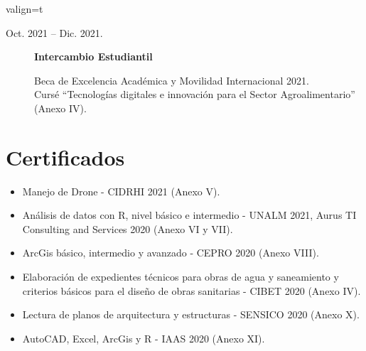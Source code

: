 \documentclass[a4paper,10pt]{article}
\begin{document}
\begin{adjustbox}{valign=t}
\begin{minipage}{0.6\textwidth}
\begin{description}
 \item[\normalfont \textcolor{ColorOne}{Oct. 2021 -- Dic. 2021.}] 
	\textbf{Intercambio Estudiantil}\\ \medskip
	
	Beca de Excelencia Académica y Movilidad Internacional 2021. \\
	
        Cursé “Tecnologías digitales e innovación para el Sector Agroalimentario” (Anexo IV).
\end{description}

	
\section*{Certificados}
\begin{itemize}[label=\textcolor{ColorOne}{$\circ$}, left=0em]
    \item Manejo de Drone - CIDRHI 2021 (Anexo V).
    \item Análisis de datos con R, nivel básico e intermedio - UNALM 2021, Aurus TI Consulting and Services 2020 (Anexo VI y VII).
    \item ArcGis básico, intermedio y avanzado - CEPRO 2020 (Anexo VIII).
    \item Elaboración de expedientes técnicos para obras de agua y saneamiento y criterios básicos para el diseño de obras sanitarias - CIBET 2020 (Anexo IV).
    \item Lectura de planos de arquitectura y estructuras - SENSICO 2020 (Anexo X).
    \item AutoCAD, Excel, ArcGis y R - IAAS 2020 (Anexo XI).
\end{itemize}


\end{minipage}
\end{adjustbox}
\end{document}
